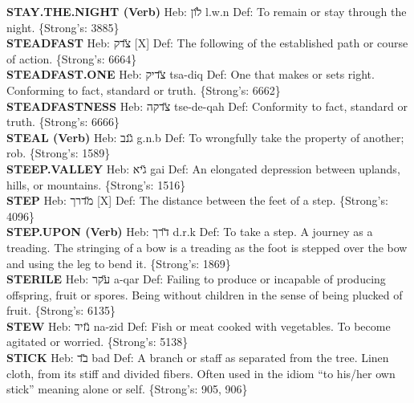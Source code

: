 {\textbf{STAY.THE.NIGHT (Verb)} Heb: {\large\H לון} l.w.n Def: To remain or stay through the night. \{Strong's: 3885\}\hfill{}\\

\textbf{STEADFAST} Heb: {\large\H צדק} {[}X{]} Def: The following of the established path or course of action. \{Strong's: 6664\}\hfill{}\\

\textbf{STEADFAST.ONE} Heb: {\large\H צדיק} tsa-diq Def: One that makes or sets right. Conforming to fact, standard or truth. \{Strong's: 6662\}\hfill{}\\

\textbf{STEADFASTNESS} Heb: {\large\H צדקה} tse-de-qah Def: Conformity to fact, standard or truth. \{Strong's: 6666\}\hfill{}\\

\textbf{STEAL (Verb)} Heb: {\large\H גנב} g.n.b Def: To wrongfully take the property of another; rob. \{Strong's: 1589\}\hfill{}\\

\textbf{STEEP.VALLEY} Heb: {\large\H גיא} gai Def: An elongated depression between uplands, hills, or mountains. \{Strong's: 1516\}\hfill{}\\

\textbf{STEP} Heb: {\large\H מדרך} {[}X{]} Def: The distance between the feet of a step. \{Strong's: 4096\}\hfill{}\\

\textbf{STEP.UPON (Verb)} Heb: {\large\H דרך} d.r.k Def: To take a step. A journey as a treading. The stringing of a bow is a treading as the foot is stepped over the bow and using the leg to bend it. \{Strong's: 1869\}\hfill{}\\

\textbf{STERILE} Heb: {\large\H עקר} a-qar Def: Failing to produce or incapable of producing offspring, fruit or spores. Being without children in the sense of being plucked of fruit. \{Strong's: 6135\}\hfill{}\\

\textbf{STEW} Heb: {\large\H נזיד} na-zid Def: Fish or meat cooked with vegetables. To become agitated or worried. \{Strong's: 5138\}\hfill{}\\

\textbf{STICK} Heb: {\large\H בד} bad Def: A branch or staff as separated from the tree. Linen cloth, from its stiff and divided fibers. Often used in the idiom ``to his/her own stick'' meaning alone or self. \{Strong's: 905, 906\}\hfill{}\\

}
